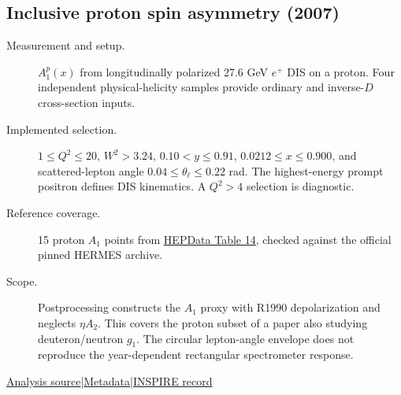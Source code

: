 \documentclass[11pt,a4paper]{article}
\newcommand{\id}[1]{{\small\texttt{\detokenize{#1}}}}
\begin{document}
\subsection{\texorpdfstring{Inclusive proton spin asymmetry (2007)}{Inclusive proton spin asymmetry (2007)}}
\id{HERMES_2007_I726689}\quad\cite{r726689}
\begin{description}
\item[Measurement and setup.] $A_1^p(x)$ from longitudinally polarized 27.6 GeV $e^+$ DIS on a proton. Four independent physical-helicity samples provide ordinary and inverse-$D$ cross-section inputs.
\item[Implemented selection.] $1\le Q^2\le20$, $W^2>3.24$, $0.10<y\le0.91$, $0.0212\le x\le0.900$, and scattered-lepton angle $0.04\le\theta_\ell\le0.22$ rad. The highest-energy prompt positron defines DIS kinematics. A $Q^2>4$ selection is diagnostic.
\item[Reference coverage.] 15 proton $A_1$ points from \href{https://doi.org/10.17182/hepdata.11211.v1/t14}{HEPData Table 14}, checked against the official pinned HERMES archive.
\item[Scope.] Postprocessing constructs the $A_1$ proxy with R1990 depolarization and neglects $\eta A_2$. This covers the proton subset of a paper also studying deuteron/neutron $g_1$. The circular lepton-angle envelope does not reproduce the year-dependent rectangular spectrometer response.
\end{description}
{\small\href{https://github.com/apapaefs/HerwigPolarizedPheno/blob/105045bd757aaa6b217e87811dc5f9a22a8d1cef/analyses/rivet/dis/HERMES_2007_I726689.cc}{Analysis source}\quad|\quad\href{https://github.com/apapaefs/HerwigPolarizedPheno/blob/105045bd757aaa6b217e87811dc5f9a22a8d1cef/analyses/rivet/dis/HERMES_2007_I726689.info}{Metadata}\quad|\quad\href{https://inspirehep.net/literature/726689}{INSPIRE record}}
\end{document}
